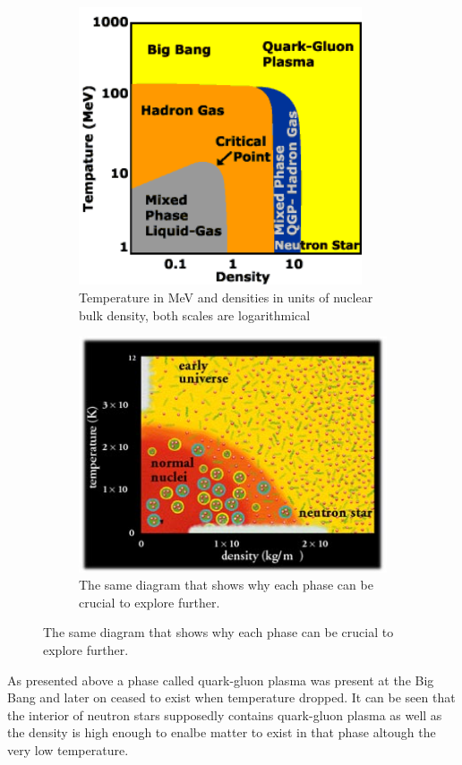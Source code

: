 \documentclass[a4paper,12pt]{article}
\begin{document}
 \begin{figure}[H]
\centering
\begin{subfigure}{.49\textwidth}
\centering
\includegraphics[width=0.92\textwidth]{cbm_phase1.png}
\caption{ Temperature in MeV and densities in units of nuclear bulk density, both scales are logarithmical }
\end{subfigure}
\begin{subfigure}{.49\textwidth}
\includegraphics[width=.92\textwidth]{cbm_phase2.jpg}
\caption{ The same diagram that shows why each phase can be crucial to explore further.  }
\end{subfigure}
\end{figure}
 \par As presented above a phase called quark-gluon plasma was present at the Big Bang and later on ceased to exist when temperature dropped. It can be seen that the interior of neutron stars supposedly contains quark-gluon plasma as well as the density is high enough to enalbe matter to exist in that phase altough the very low temperature. 
\end{document}
